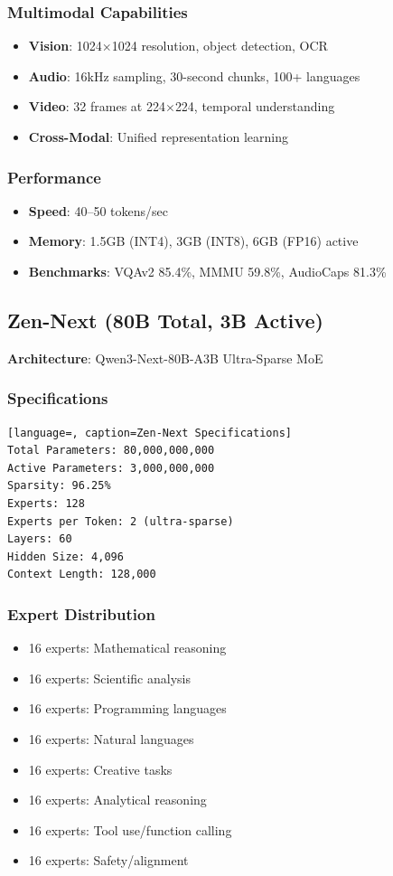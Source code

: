 \documentclass[11pt,a4paper]{article}
\begin{document}
\subsubsection{Multimodal Capabilities}
\begin{itemize}
    \item \textbf{Vision}: 1024$\times$1024 resolution, object detection, OCR
    \item \textbf{Audio}: 16kHz sampling, 30-second chunks, 100+ languages
    \item \textbf{Video}: 32 frames at 224$\times$224, temporal understanding
    \item \textbf{Cross-Modal}: Unified representation learning
\end{itemize}

\subsubsection{Performance}
\begin{itemize}
    \item \textbf{Speed}: 40--50 tokens/sec
    \item \textbf{Memory}: 1.5GB (INT4), 3GB (INT8), 6GB (FP16) active
    \item \textbf{Benchmarks}: VQAv2 85.4\%, MMMU 59.8\%, AudioCaps 81.3\%
\end{itemize}

\subsection{Zen-Next (80B Total, 3B Active)}
\textbf{Architecture}: Qwen3-Next-80B-A3B Ultra-Sparse MoE

\subsubsection{Specifications}
\begin{lstlisting}[language=, caption=Zen-Next Specifications]
Total Parameters: 80,000,000,000
Active Parameters: 3,000,000,000
Sparsity: 96.25%
Experts: 128
Experts per Token: 2 (ultra-sparse)
Layers: 60
Hidden Size: 4,096
Context Length: 128,000
\end{lstlisting}

\subsubsection{Expert Distribution}
\begin{itemize}
    \item 16 experts: Mathematical reasoning
    \item 16 experts: Scientific analysis
    \item 16 experts: Programming languages
    \item 16 experts: Natural languages
    \item 16 experts: Creative tasks
    \item 16 experts: Analytical reasoning
    \item 16 experts: Tool use/function calling
    \item 16 experts: Safety/alignment
\end{itemize}
\end{document}
